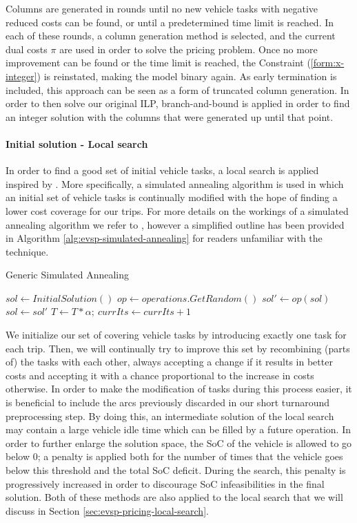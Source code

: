 \documentclass[]{article}
\begin{document}
Columns are generated in rounds until no new vehicle tasks with negative reduced costs can be found, or until a predetermined time limit is reached. In each of these rounds, a column generation method is selected, and the current dual costs $\pi$ are used in order to solve the pricing problem. Once no more improvement can be found or the time limit is reached, the Constraint (\ref{form:x-integer}) is reinstated, making the model binary again. As early termination is included, this approach can be seen as a form of truncated column generation. In order to then solve our original ILP, branch-and-bound is applied in order to find an integer solution with the columns that were generated up until that point.

\paragraph{Initial solution - Local search} \label{sec:evsp-initial-local-search}
In order to find a good set of initial vehicle tasks, a local search is applied inspired by \citet{Bosch21}. More specifically, a simulated annealing algorithm is used in which an initial set of vehicle tasks is continually modified with the hope of finding a lower cost coverage for our trips. For more details on the workings of a simulated annealing algorithm we refer to \citet{Kirk83}, however a simplified outline has been provided in Algorithm \ref{alg:evsp-simulated-annealing} for readers unfamiliar with the technique.

\begin{algorithm}
\caption{Generic Simulated Annealing}\label{alg:evsp-simulated-annealing}
\begin{algorithmic}
\State $sol \gets InitialSolution()$
    \State $op \gets operations.GetRandom()$
    \State $sol' \gets op(sol)$
      $sol \gets sol'$
    \EndIf
    \State $T \gets T * \alpha;\:currIts \gets currIts + 1$
\EndWhile
\end{algorithmic}
\end{algorithm}

We initialize our set of covering vehicle tasks by introducing exactly one task for each trip. Then, we will continually try to improve this set by recombining (parts of) the tasks with each other, always accepting a change if it results in better costs and accepting it with a chance proportional to the increase in costs otherwise. In order to make the modification of tasks during this process easier, it is beneficial to include the arcs previously discarded in our short turnaround preprocessing step. By doing this, an intermediate solution of the local search may contain a large vehicle idle time which can be filled by a future operation. In order to further enlarge the solution space, the SoC of the vehicle is allowed to go below 0; a penalty is applied both for the number of times that the vehicle goes below this threshold and the total SoC deficit. During the search, this penalty is progressively increased in order to discourage SoC infeasibilities in the final solution. Both of these methods are also applied to the local search that we will discuss in Section \ref{sec:evsp-pricing-local-search}.
\end{document}

